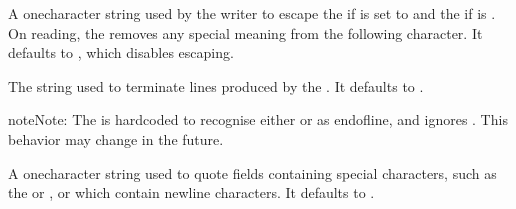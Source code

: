 \documentclass[letterpaper,10pt,english]{sphinxmanual}
\begin{document}

\begin{fulllineitems}
\label{\detokenize{csv:csv.Dialect.escapechar}}
A one\sphinxhyphen{}character string used by the writer to escape the  if 
is set to {\hyperref[\detokenize{csv:csv.QUOTE_NONE}]{}} and the  if  is
. On reading, the  removes any special meaning from
the following character. It defaults to , which disables escaping.

\end{fulllineitems}


\begin{fulllineitems}
\label{\detokenize{csv:csv.Dialect.lineterminator}}
The string used to terminate lines produced by the {\hyperref[\detokenize{csv:csv.writer}]{}}. It defaults
to .

\begin{sphinxadmonition}{note}{Note:}
The {\hyperref[\detokenize{csv:csv.reader}]{}} is hard\sphinxhyphen{}coded to recognise either  or  as
end\sphinxhyphen{}of\sphinxhyphen{}line, and ignores . This behavior may change in the
future.
\end{sphinxadmonition}

\end{fulllineitems}


\begin{fulllineitems}
\label{\detokenize{csv:csv.Dialect.quotechar}}
A one\sphinxhyphen{}character string used to quote fields containing special characters, such
as the  or , or which contain new\sphinxhyphen{}line characters.  It
defaults to .

\end{fulllineitems}
\end{document}
